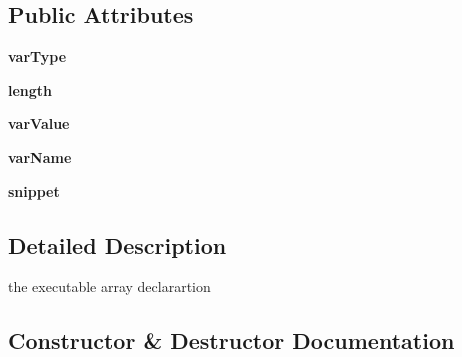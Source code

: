 \subsection*{Public Attributes}
\begin{DoxyCompactItemize}
\item 
{\bfseries var\+Type}\hypertarget{class_parsing_classes_actual_1_1_array_declaration_ab6f480c66cf067f1ecf0f9562449355d}{}\label{class_parsing_classes_actual_1_1_array_declaration_ab6f480c66cf067f1ecf0f9562449355d}

\item 
{\bfseries length}\hypertarget{class_parsing_classes_actual_1_1_array_declaration_ae972ee9b5127dc41e06acda8f2c773d9}{}\label{class_parsing_classes_actual_1_1_array_declaration_ae972ee9b5127dc41e06acda8f2c773d9}

\item 
{\bfseries var\+Value}\hypertarget{class_parsing_classes_actual_1_1_array_declaration_a9f5d5d01d5f35a289d1002a1205765a9}{}\label{class_parsing_classes_actual_1_1_array_declaration_a9f5d5d01d5f35a289d1002a1205765a9}

\item 
{\bfseries var\+Name}\hypertarget{class_parsing_classes_actual_1_1_array_declaration_a0ce835763153799054bf9bbf08536419}{}\label{class_parsing_classes_actual_1_1_array_declaration_a0ce835763153799054bf9bbf08536419}

\item 
{\bfseries snippet}\hypertarget{class_parsing_classes_actual_1_1_array_declaration_ac7ecc062ecd220e792a8e272bc86a6c1}{}\label{class_parsing_classes_actual_1_1_array_declaration_ac7ecc062ecd220e792a8e272bc86a6c1}

\end{DoxyCompactItemize}


\subsection{Detailed Description}
the executable array declarartion 

\subsection{Constructor \& Destructor Documentation}
